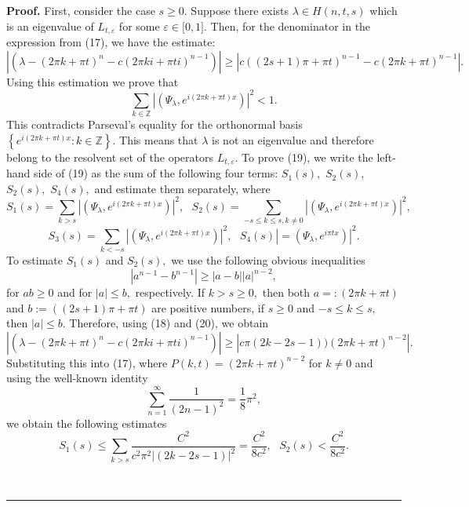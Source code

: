\documentclass{article}%
\newenvironment{proof}[1][Proof]{\textbf{#1.} }{\ \rule{0.5em}{0.5em}}
\begin{document}
\begin{proof}
\bigskip First, consider the case $s\geq0$. Suppose there exists $\lambda\in
H(n,t,s)$ which is an eigenvalue of $L_{t,\varepsilon}$ for some
$\varepsilon\in\lbrack0,1].$ Then, for the denominator in the expression from
(17), we have the estimate:
\begin{equation}
\left\vert \left(  \lambda-\left(  2\pi k+\pi t\right)  ^{n}-c(2\pi ki+\pi
ti)^{n-1}\right)  \right\vert \geq\left\vert c((2s+1)\pi+\pi t)^{n-1}-c(2\pi
k+\pi t)^{n-1}\right\vert .\tag{18}%
\end{equation}
Using this estimation we prove that
\begin{equation}
\sum_{k\in\mathbb{Z}}\left\vert \left(  \Psi_{\lambda},e^{i\left(  2\pi k+\pi
t\right)  x}\right)  \right\vert ^{2}<1.\tag{19}%
\end{equation}
This contradicts Parseval's equality for the orthonormal basis $\left\{
e^{i\left(  2\pi k+\pi t\right)  x}:k\in\mathbb{Z}\right\}  .$ This means that
$\lambda$ is not an eigenvalue and therefore belong to the resolvent set of
the operators $L_{t,\varepsilon}$. To prove (19), we write the left-hand side
of (19) as the sum of the following four terms: $S_{1}(s),$ $S_{2}(s),$
$S_{2}(s),$ $S_{4}(s),$ and estimate them separately, where
\[
S_{1}(s)=\sum_{k>s}\left\vert \left(  \Psi_{\lambda},e^{i\left(  2\pi k+\pi
t\right)  x}\right)  \right\vert ^{2},\text{ }S_{2}(s)=\sum_{-s\leq k\leq
s,k\neq0}\left\vert \left(  \Psi_{\lambda},e^{i\left(  2\pi k+\pi t\right)
x}\right)  \right\vert ^{2},
\]%
\[
S_{3}(s)=\sum_{k<-s}\left\vert \left(  \Psi_{\lambda},e^{i\left(  2\pi k+\pi
t\right)  x}\right)  \right\vert ^{2},\text{ }S_{4}(s)\left\vert =\left(
\Psi_{\lambda},e^{i\pi tx}\right)  \right\vert ^{2}.
\]
To estimate $S_{1}(s)$ and $S_{2}(s),$ we use the following obvious
inequalities
\begin{equation}
\left\vert a^{n-1}-b^{n-1}\right\vert \geq\left\vert a-b\right\vert \left\vert
a\right\vert ^{n-2},\tag{20}%
\end{equation}
for $ab\geq0$ and for $\left\vert a\right\vert \leq b,$ respectively. If
$k>s\geq0,$ then both $a=:(2\pi k+\pi t)$ and $b:=((2s+1)\pi+\pi t)$ are
positive numbers, if $s\geq0$ and $-s\leq k\leq s,$ then $\left\vert
a\right\vert \leq b.$ Therefore, using (18) and (20), we obtain
\[
\left\vert \left(  \lambda-\left(  2\pi k+\pi t\right)  ^{n}-c(2\pi ki+\pi
ti)^{n-1}\right)  \right\vert \geq\left\vert c\pi(2k-2s-1))(2\pi k+\pi
t)^{n-2}\right\vert .
\]
Substituting this into (17), where $P(k,t)=\left(  2\pi k+\pi t\right)
^{n-2}$ for $k\neq0$ and using the well-known identity
\begin{equation}
\sum_{n=1}^{\infty}\frac{1}{(2n-1)^{2}}=\frac{1}{8}\pi^{2},\tag{21}%
\end{equation}
we obtain the following estimates
\begin{equation}
S_{1}(s)\leq\sum_{k>s}\frac{C^{2}}{c^{2}\pi^{2}\left\vert (2k-2s-1)\right\vert
^{2}}=\frac{C^{2}}{8c^{2}},\text{ }S_{2}(s)<\frac{C^{2}}{8c^{2}}.\tag{22}%
\end{equation}



\end{proof}
\end{document}
